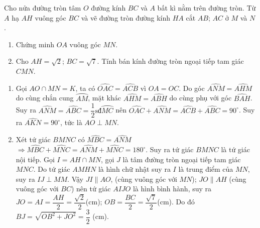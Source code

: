 \begin{ex}%
    Cho nửa đường tròn tâm $O$ đường kính $BC$ và $A$ bất kì nằm trên đường tròn. Từ $A$ hạ $AH$ vuông góc $BC$ và vẽ đường tròn đường kính $HA$ cắt $AB$; $AC$ ở $M$ và $N$.
    \begin{enumerate}
        \item Chứng minh $OA$ vuông góc $MN$.
        \item Cho $AH=\sqrt{2}$; $BC=\sqrt{7}$. Tính bán kính đường tròn ngoại tiếp tam giác $CMN$.
    \end{enumerate}
\loigiai
    {
     \begin{center}
    \end{center}   
    \begin{enumerate}
        \item Gọi $AO\cap MN=K$, ta có $\widehat{{OAC}}=\widehat{{ACB}}$ vì $OA=OC$. 
        Do góc $\widehat{ANM} = \widehat{AHM}$ do cùng chắn cung $\wideparen{AM}$, mặt khác  $\widehat{AHM}=\widehat{ABH}$ do cùng phụ với góc $\widehat{BAH}$.\\ Suy ra 
         $\widehat{{ANM}}=\widehat{{ABC}}=\dfrac{1}{2}\text{sđ}\wideparen{MC}$ nên $\widehat{{OAC}}+\widehat{{ANM}}=\widehat{{ACB}}+\widehat{{ABC}}=90^\circ$. Suy ra $\widehat{{AKN}}=90^\circ$, tức là $AO\perp MN$.
        \item Xét tứ giác $BMNC$ có $\widehat{{MBC}}=\widehat{{ANM}}$ $\Rightarrow \widehat{{MBC}}+\widehat{{MNC}}=\widehat{{ANM}}+\widehat{{MNC}}=180^\circ$.
        Suy ra tứ giác $BMNC$ là tứ giác nội tiếp.
        Gọi $I=AH\cap MN$, gọi $J$ là tâm đường tròn ngoại tiếp tam giác $MNC$.
        Do tứ giác $AMHN$ là hình chữ nhật suy ra $I$ là trung điểm của $MN$, suy ra $IJ \perp MM$. Vậy  $JI\parallel AO$, (cùng vuông góc với $MN$); $JO\parallel AH$ (cùng vuông góc với $BC$) nên tứ giác $AIJO$ là hình bình hành, suy ra
        $JO=AI=\dfrac{AH}{2}=\dfrac{\sqrt{2}}{2}$(cm); $OB=\dfrac{BC}{2}=\dfrac{\sqrt{7}}{2}$(cm). Do đó $BJ=\sqrt{{OB^2+JO^2}}=\dfrac{3}{2}$ (cm). 
    \end{enumerate}
    }
\end{ex}


